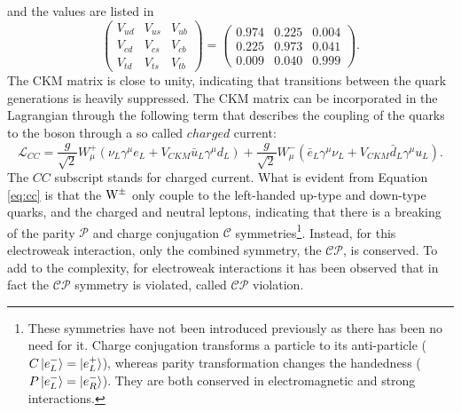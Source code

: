 and the values are listed in \cite{PhysRevD.98.030001}
\begin{equation}
\begin{pmatrix} V_{ud} & V_{us} & V_{ub} \\ V_{cd} & V_{cs} & V_{cb} \\ V_{td} & V_{ts} & V_{tb} \end{pmatrix} =\begin{pmatrix} 0.974 & 0.225 & 0.004 \\ 0.225 & 0.973 & 0.041 \\ 0.009 & 0.040 & 0.999 \end{pmatrix}.
\end{equation}
The CKM matrix is close to unity, indicating that transitions between the quark generations is heavily suppressed.  
The CKM matrix can be incorporated in the Lagrangian through the following term that describes the coupling of the quarks to the \PW boson through a so called $charged$ current:
\begin{equation}
\mathcal{L}_{CC}=\frac{g}{\sqrt{2}}W^{+}_{\mu}(\nu_{L}\gamma^{\mu}e_{L} +V_{CKM}\bar{u}_{L}\gamma^{\mu}d_{L})+\frac{g}{\sqrt{2}}W^{-}_{\mu}(\bar{e}_{L}\gamma^{\mu}\nu_{L} +V_{CKM}\bar{d}_{L}\gamma^{\mu}u_{L}).
\label{eq:cc}
\end{equation}
The $CC$ subscript stands for charged current.
What is evident from Equation \ref{eq:cc} is that the $\mathrm{W}^{\pm}$ only couple to the left-handed up-type and down-type quarks, and the charged and neutral leptons, indicating that there is a breaking of the parity $\mathcal{P}$ and charge conjugation $\mathcal{C}$ symmetries\footnote{These symmetries have not been introduced previously as there has been no need for it. Charge conjugation transforms a particle to its anti-particle ($C\ket{e^{-}_{L}}=\ket{e^{+}_{L}}$), whereas parity transformation changes the handedness ($P\ket{e^{-}_{L}}=\ket{e^{-}_{R}}$). They are both conserved in electromagnetic and strong interactions.}. 
Instead, for this electroweak interaction, only the combined symmetry, the $\mathcal{CP}$, is conserved.
To add to the complexity, for electroweak interactions it has been observed that in fact the $\mathcal{CP}$ symmetry is violated, called $\mathcal{CP}$ violation.  

